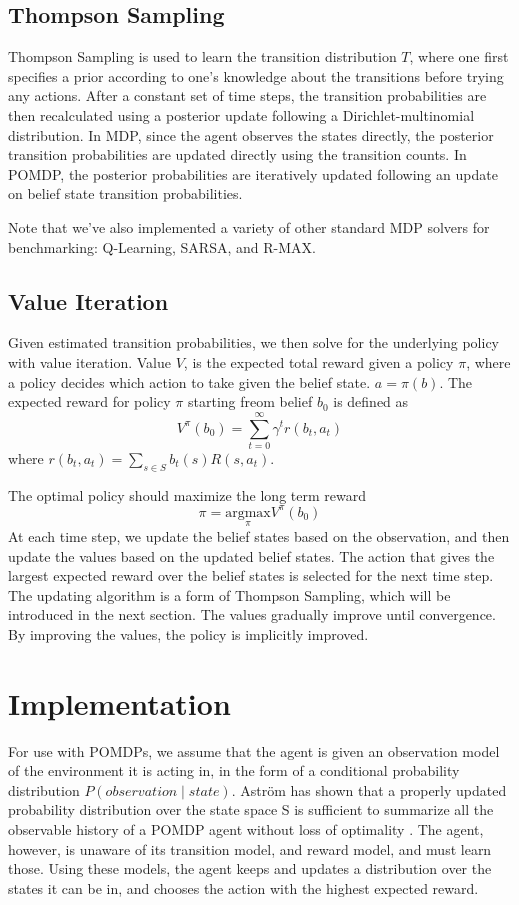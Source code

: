 \documentclass{pset}
\begin{document}
\subsection{Thompson Sampling}
Thompson Sampling is used to learn the transition distribution $T$, where one
first specifies a prior according to one's knowledge about the transitions
before trying any actions. After a constant set of time steps, the transition
probabilities are then recalculated using a posterior update following a
Dirichlet-multinomial distribution. In MDP, since the agent observes the states
directly, the posterior transition probabilities are updated directly using the
transition counts. In POMDP, the posterior probabilities are iteratively updated
following an update on belief state transition probabilities.

Note that we've also implemented a variety of other standard MDP solvers for
benchmarking: Q-Learning, SARSA, and R-MAX.

\subsection{Value Iteration}
Given estimated transition probabilities, we then solve for the underlying policy with value iteration. Value $V$, is the expected total reward
given a policy $\pi$, where a policy decides which action to take given the
belief state. $a = \pi(b)$. The expected reward for policy $\pi$ starting freom
belief $b_0$ is defined as
\[ V^{\pi}(b_{0})=\sum\limits_{t=0}^\infty \gamma^{t}r(b_t,a_t) \]
where $r(b_t, a_t) = \sum\limits_{s \in S} b_t(s)R(s,a_t)$.

The optimal policy should maximize the long term reward
\[ \pi = \underset{\pi}{\text{argmax}} V^{\pi}(b_0) \]
At each time step, we update the belief states based on the observation, and
then update the values based on the updated belief states. The action that gives
the largest expected reward over the belief states is selected for the next time
step. The updating algorithm is a form of Thompson Sampling, which will be
introduced in the next section. The values gradually improve until convergence.
By improving the values, the policy is implicitly improved.
\section{Implementation}
For use with POMDPs, we assume that the agent is given an observation model of the
environment it is acting in, in the form of a conditional probability distribution
$P(observation \mid state)$. Astr\"{o}m has shown that a properly updated probability
distribution over the state space S is sufficient to summarize all the observable
history of a POMDP agent without loss of optimality \cite{astrom1965optimal}. The agent, however, is unaware of its transition model, and
reward model, and must learn those. Using these models, the agent keeps and
updates a distribution over the states it can be in, and chooses the action with
the highest expected reward.
\end{document}
